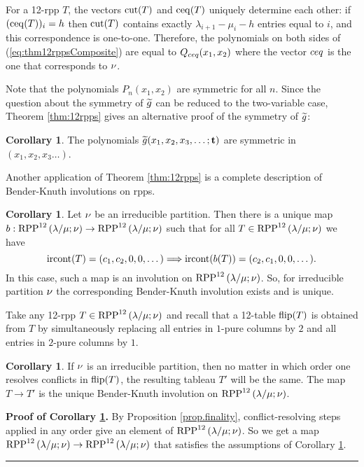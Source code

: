 \documentclass[numbers=enddot,12pt,final,onecolumn,notitlepage]{scrartcl}%
\theoremstyle{definition}
\newtheorem{coro}[theo]{Corollary}
\newenvironment{proof}[1][Proof]{\noindent\textbf{#1.} }{\ \rule{0.5em}{0.5em}}
\begin{document}
 For a 12-rpp $T$, the vectors ${\operatorname*{cut}}(T)$ and ${\operatorname*{ceq}}(T)$ uniquely determine each other: if $({\operatorname*{ceq}}(T))_i=h$ then ${\operatorname*{cut}}(T)$ contains exactly $\lambda_{i+1}-\mu_i-h$ entries equal to $i$, and this correspondence is one-to-one. Therefore, the polynomials on both sides of (\ref{eq:thm12rppsComposite}) are equal to $Q_{{{ceq}}}(x_1,x_2)$ where the vector ${{ceq}}$ is the one that corresponds to ${{\nu}}$.

 Note that the polynomials $P_n(x_1,x_2)$ are symmetric for all $n$. Since the question about the symmetry of ${\widetilde{g}}$ can be reduced to the two-variable case, Theorem \ref{thm:12rpps} gives an alternative proof of the symmetry of ${\widetilde{g}}$:
\begin{coro}
 The polynomials ${\widetilde{g}}(x_1,x_2,x_3,\dots;{\mathbf{t}})$ are symmetric in $(x_1,x_2,x_3\dots)$.
\end{coro}

Another application of Theorem \ref{thm:12rpps} is a complete description of Bender-Knuth involutions on rpps.

\begin{coro}
\label{cor:uniqueBK}
Let ${{\nu}}$ be an irreducible partition. Then there is a unique map $b:{\operatorname*{RPP}^{12}\left( \lambda/\mu ;{{\nu}} \right)}\to{\operatorname*{RPP}^{12}\left( \lambda/\mu ;{{\nu}}\right)}$ such that for all $T\in{\operatorname*{RPP}^{12}\left( \lambda/\mu ;{{\nu}}\right)}$ we have 
$${\operatorname*{ircont}}(T)=(c_1,c_2,0,0,\dots)\Longrightarrow {\operatorname*{ircont}}(b(T))=(c_2,c_1,0,0,\dots).$$
In this case, such a map is an involution on ${\operatorname*{RPP}^{12}\left( \lambda/\mu ;{{\nu}} \right)}$. So, for irreducible partition ${{\nu}}$ the corresponding Bender-Knuth involution exists and is unique.
\end{coro}

Take any 12-rpp $T\in{\operatorname*{RPP}^{12}\left( \lambda/\mu ;{{\nu}}\right)}$ and recall that a 12-table ${\operatorname*{flip}}(T)$ is obtained from $T$ by simultaneously replacing all entries in $1$-pure columns by $2$ and all entries in $2$-pure columns by $1$. 

\begin{coro}
\label{cor:confluence}
 If ${{\nu}}$ is an irreducible partition, then no matter in which order one resolves conflicts in ${\operatorname*{flip}}(T)$, the resulting tableau $T'$ will be the same. The map $T\to T'$ is the unique Bender-Knuth involution on ${\operatorname*{RPP}^{12}\left( \lambda/\mu ;{{\nu}} \right)}$.
\end{coro}
\begin{proof}[Proof of Corollary \ref{cor:confluence}]
 By Proposition \ref{prop.finality}, conflict-resolving steps applied in any order give an element of ${\operatorname*{RPP}^{12}\left( \lambda/\mu ;{{\nu}} \right)}$. So we get a map ${\operatorname*{RPP}^{12}\left( \lambda/\mu ;{{\nu}} \right)}\to {\operatorname*{RPP}^{12}\left( \lambda/\mu ;{{\nu}}\right)}$ that satisfies the assumptions of Corollary \ref{cor:uniqueBK}.
\end{proof}
\end{document}
